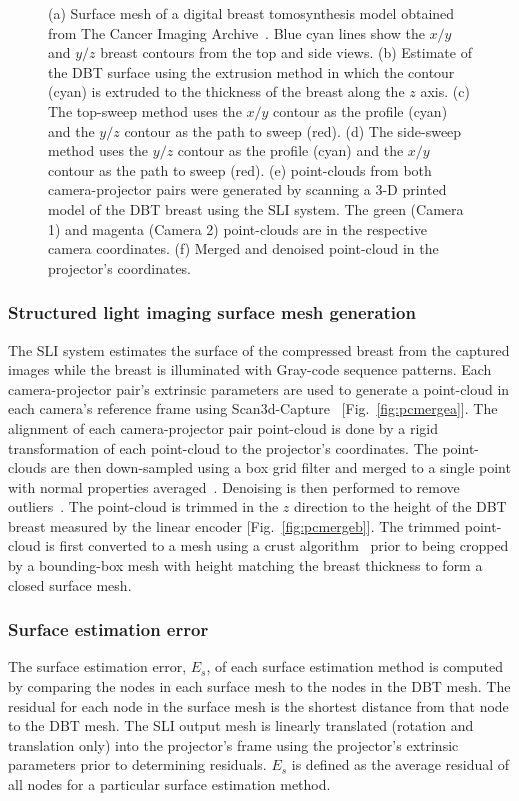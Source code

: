 \begin{figure}
\begin{center}
	\end{center}
	\caption{(a) Surface mesh of a digital breast tomosynthesis model obtained from The Cancer Imaging Archive~\cite{Clark2013}. Blue cyan lines show the $x/y$ and $y/z$ breast contours from the top and side views. (b) Estimate of the DBT surface using the extrusion method in which the contour (cyan) is extruded to the thickness of the breast along the $z$ axis. (c) The top-sweep method uses the $x/y$ contour as the profile (cyan) and the $y/z$ contour as the path to sweep (red). (d) The side-sweep method uses the $y/z$ contour as the profile (cyan) and the $x/y$ contour as the path to sweep (red). (e) point-clouds from both camera-projector pairs were generated by scanning a 3-D printed model of the DBT breast using the SLI system. The green (Camera 1) and magenta (Camera 2) point-clouds are in the respective camera coordinates. (f) Merged and denoised point-cloud in the projector's coordinates.} 
	\label{fig:meshes}
\end{figure} 

\subsubsection{Structured light imaging surface mesh generation}
The SLI system estimates the surface of the compressed breast from the captured images while the breast is illuminated with Gray-code sequence patterns. Each camera-projector pair's extrinsic parameters are used to generate a point-cloud in each camera's reference frame using Scan3d-Capture~\cite{Moreno2012a} [Fig.~\ref{fig:pcmergea}]. The alignment of each camera-projector pair point-cloud is done by a rigid transformation of each point-cloud to the projector's coordinates. The point-clouds are then down-sampled using a box grid filter and merged to a single point with normal properties averaged~\cite{Pomerleau2013}. Denoising is then performed to remove outliers~\cite{Rusu2008}. The point-cloud is trimmed in the $z$ direction to the height of the DBT breast measured by the linear encoder [Fig.~\ref{fig:pcmergeb}]. The trimmed point-cloud is first converted to a mesh using a crust algorithm~\cite{Crust1999} prior to being cropped by a bounding-box mesh with height matching the breast thickness to form a closed surface mesh. 

\subsubsection{Surface estimation error}
The surface estimation error, $E_s$, of each surface estimation method is computed by comparing the nodes in each surface mesh to the nodes in the DBT mesh. The residual for each node in the surface mesh is the shortest distance from that node to the DBT mesh. The SLI output mesh is linearly translated (rotation and translation only) into the projector's frame using the projector's extrinsic parameters prior to determining residuals. $E_s$ is defined as the average residual of all nodes for a particular surface estimation method. 


